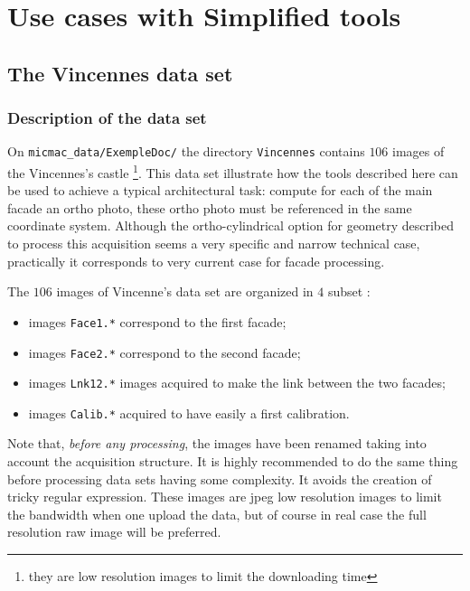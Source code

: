 \chapter{Use cases with Simplified tools}



\section{The Vincennes data set}


\subsection{Description of the data set}
\label{Vincennes:DataSet}

On {\tt micmac\_data/ExempleDoc/} the directory {\tt Vincennes} contains
$106$ images of the Vincennes's castle \footnote{they are low resolution images
to limit the  downloading time}. This data set illustrate how
the tools described here can be used to achieve a typical architectural task:
compute for each of the main facade an ortho photo, these ortho photo
must be referenced in the same coordinate system.  Although the ortho-cylindrical
option for geometry described to process this acquisition seems a very specific
and narrow technical case, practically it corresponds to very current case
for facade processing.


The $106$ images of Vincenne's data set are organized in $4$ subset :


\begin{itemize}
   \item  images {\tt Face1.*} correspond to the first facade;
   \item  images {\tt Face2.*} correspond to the second facade;
   \item  images {\tt  Lnk12.*} images acquired to make the link between
           the two facades;
   \item  images {\tt  Calib.*} acquired to have easily a first
           calibration.
\end{itemize}

Note that, \emph{before any processing}, the images have been renamed taking
into account the acquisition structure. It is highly recommended to do the
same thing before processing data sets having some complexity. It avoids
the creation of tricky regular expression. These images are jpeg low resolution
images to limit the bandwidth when one upload the data, but of course in
real case the full resolution raw image will be preferred.


